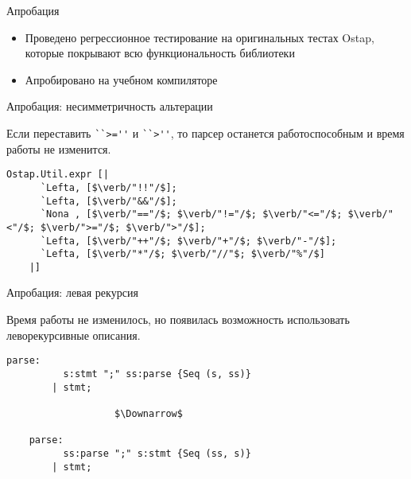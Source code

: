 \documentclass[10pt, mathserif]{beamer}
\theoremstyle{definition}
\begin{document}
\begin{frame}[fragile]{Апробация}
  \begin{itemize}
     \item Проведено регрессионное тестирование на оригинальных тестах Ostap, которые покрывают всю функциональность библиотеки
     \vskip3mm

     \item Апробировано на учебном компиляторе
  \end{itemize}
\end{frame}

\begin{frame}[fragile]{Апробация: несимметричность альтерации}

  Если переставить \lstinline|``>=''| и \lstinline|``>''|, то парсер останется работоспособным и время работы не изменится.

  \begin{lstlisting}[basicstyle=\small]
    Ostap.Util.expr [|
      `Lefta, [$\verb/"!!"/$];
      `Lefta, [$\verb/"&&"/$];
      `Nona , [$\verb/"=="/$; $\verb/"!="/$; $\verb/"<="/$; $\verb/"<"/$; $\verb/">="/$; $\verb/">"/$];
      `Lefta, [$\verb/"++"/$; $\verb/"+"/$; $\verb/"-"/$];
      `Lefta, [$\verb/"*"/$; $\verb/"//"$; $\verb/"%"/$]
    |]
  \end{lstlisting}
  \vskip3mm
\end{frame}

\begin{frame}[fragile]{Апробация: левая рекурсия}

  Время работы не изменилось, но появилась возможность использовать леворекурсивные описания.
  \vskip3mm
  \begin{lstlisting}[basicstyle=\small]
    parse:
          s:stmt ";" ss:parse {Seq (s, ss)}
        | stmt;

                   $\Downarrow$

    parse:
          ss:parse ";" s:stmt {Seq (ss, s)}
        | stmt;

  \end{lstlisting}

\end{frame}
\end{document}
